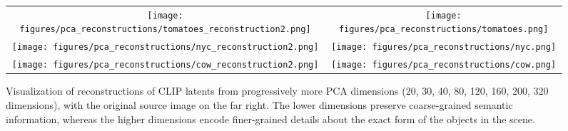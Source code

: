 \documentclass{article}
\begin{document}
\begin{figure*}[t]
    \centering
    \setlength{\tabcolsep}{0.6pt}
    \renewcommand{\arraystretch}{0}
    \begin{tabular}{cc}
        \texttt{[image: figures/pca\_reconstructions/tomatoes\_reconstruction2.png]} & 
        \texttt{[image: figures/pca\_reconstructions/tomatoes.png]}
         \\
        \texttt{[image: figures/pca\_reconstructions/nyc\_reconstruction2.png]} &
        \texttt{[image: figures/pca\_reconstructions/nyc.png]}
         \\
         \texttt{[image: figures/pca\_reconstructions/cow\_reconstruction2.png]} &
        \texttt{[image: figures/pca\_reconstructions/cow.png]}
         \\
    \end{tabular}
    \caption{Visualization of reconstructions of CLIP latents from progressively more PCA dimensions (20, 30, 40, 80, 120, 160, 200, 320 dimensions), with the original source image on the far right. The lower dimensions preserve coarse-grained semantic information, whereas the higher dimensions encode finer-grained details about the exact form of the objects in the scene.}
    \label{fig:pca_reconstructions}
\end{figure*}
\end{document}
